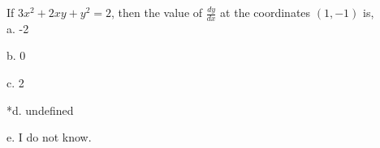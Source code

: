 
If \( 3x^{2} + 2xy + y^{2} = 2 \), then the value of
\( \frac{dy}{dx} \) at the coordinates \( (1, -1) \) is,\\

a. -2

b. 0

c. 2

*d. undefined

e. I do not know.\\

